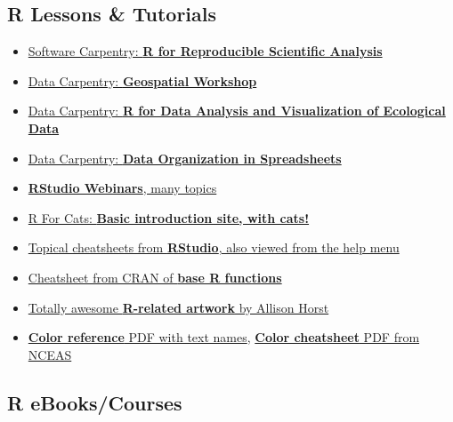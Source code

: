 \documentclass[
]{book}
\providecommand{\tightlist}{%
  \setlength{\itemsep}{0pt}\setlength{\parskip}{0pt}}
\begin{document}
\hypertarget{r-lessons-tutorials}{%
\subsection{R Lessons \& Tutorials}\label{r-lessons-tutorials}}

\begin{itemize}
\tightlist
\item
  \href{http://data-lessons.github.io/gapminder-R/}{Software Carpentry: \textbf{R for Reproducible Scientific Analysis}}
\item
  \href{https://datacarpentry.org/geospatial-workshop/}{Data Carpentry: \textbf{Geospatial Workshop}}
\item
  \href{http://www.datacarpentry.org/R-ecology-lesson/}{Data Carpentry: \textbf{R for Data Analysis and Visualization of Ecological Data}}
\item
  \href{http://www.datacarpentry.org/spreadsheet-ecology-lesson/}{Data Carpentry: \textbf{Data Organization in Spreadsheets}}
\item
  \href{https://www.rstudio.com/resources/webinars/}{\textbf{RStudio Webinars}, many topics}
\item
  \href{http://rforcats.net/}{R For Cats: \textbf{Basic introduction site, with cats!}}
\item
  \href{http://www.rstudio.com/resources/cheatsheets/}{Topical cheatsheets from \textbf{RStudio}, also viewed from the help menu}
\item
  \href{http://cran.r-project.org/doc/contrib/Short-refcard.pdf}{Cheatsheet from CRAN of \textbf{base R functions}}
\item
  \href{https://github.com/allisonhorst/stats-illustrations}{Totally awesome \textbf{R-related artwork} by Allison Horst}
\item
  \href{http://www.stat.columbia.edu/~tzheng/files/Rcolor.pdf}{\textbf{Color reference} PDF with text names}, \href{https://www.nceas.ucsb.edu/sites/default/files/2020-04/colorPaletteCheatsheet.pdf}{\textbf{Color cheatsheet} PDF from NCEAS}
\end{itemize}

\hypertarget{r-ebookscourses}{%
\subsection{R eBooks/Courses}\label{r-ebookscourses}}
\end{document}
